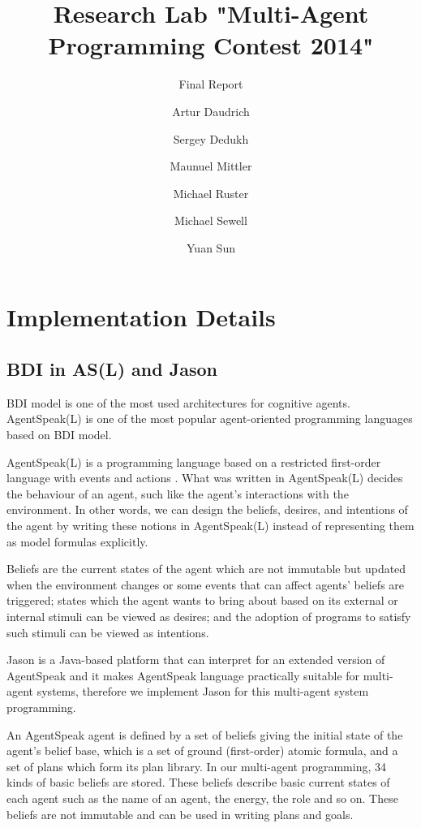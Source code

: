 \documentclass{llncs}
\title{Research Lab "Multi-Agent Programming Contest 2014"}
\subtitle{Final Report}
\author{Artur Daudrich \and Sergey Dedukh \and Maunuel Mittler \and Michael Ruster \and Michael Sewell \and Yuan Sun}
\institute{University of Koblenz-Landau, Koblenz Campus}
\begin{document}
\maketitle

\section{Implementation Details}
\subsection{BDI in AS(L) and Jason}

BDI model is one of the most used architectures for cognitive agents. AgentSpeak(L) is one of the most popular agent-oriented programming languages based on BDI model.

AgentSpeak(L) is a programming language based on a restricted first-order language with events and actions \cite{anand_AgentSpeak_1996}. What was written in AgentSpeak(L) decides the behaviour of an agent, such like the agent's interactions with the environment. In other words, we can design the beliefs, desires, and intentions of the agent by writing these notions in AgentSpeak(L) instead of representing them as model formulas explicitly.

Beliefs are the current states of the agent which are not immutable but updated when the environment changes or some events that can affect agents' beliefs are triggered; states which the agent wants to bring about based on its external or internal stimuli can be viewed as desires; and the adoption of programs to satisfy such stimuli can be viewed as intentions\cite{anand_AgentSpeak_1996}. 

Jason is a Java-based platform that can interpret for an extended version of AgentSpeak and it makes AgentSpeak language practically suitable for multi-agent systems, therefore we implement Jason for this multi-agent system programming. 

An AgentSpeak agent is defined by a set of beliefs giving the initial state of the agent’s belief base, which is a set of ground (first-order) atomic formula, and a set of plans which form its plan library\cite{rafael_BDIAgent_2005}. In our multi-agent programming, 34 kinds of basic beliefs are stored. These beliefs describe basic current states of each agent such as the name of an agent, the energy, the role and so on. These beliefs are not immutable and can be used in writing plans and goals. 
\end{document}
